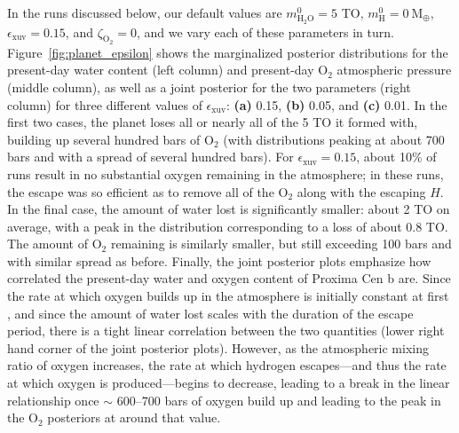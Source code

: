 \documentclass[]{emulateapj}
\begin{document}
In the runs discussed below, our default values are $m_\mathrm{H_2O}^0 = 5$ TO, $m_\mathrm{H}^0 = 0\ \mathrm{M_\oplus}$,
$\epsilon_\mathrm{xuv} = 0.15$, and $\zeta_\mathrm{O_2} = 0$, and we vary each of these parameters in turn. 
Figure~\ref{fig:planet_epsilon} shows the marginalized posterior distributions for the present-day water content (left column)
and present-day O$_2$ atmospheric pressure (middle column), as well as a joint posterior for the two parameters (right column)
for three different values of $\epsilon_\mathrm{xuv}$: \textbf{(a)} 0.15, \textbf{(b)} 0.05, and \textbf{(c)} 0.01. In the first
two cases, the planet loses all or nearly all of the 5 TO it formed with, building up several hundred bars of O$_2$ (with
distributions peaking at about 700 bars and with a spread of several hundred bars). For $\epsilon_\mathrm{xuv} = 0.15$, about
10\% of runs result in no substantial oxygen remaining in the atmosphere; in these runs, the escape was so efficient as to
remove all of the O$_2$ along with the escaping $H$. In the final case, the amount of water lost is significantly smaller:
about 2 TO on average, with a peak in the distribution corresponding to a loss of about 0.8 TO. The amount of O$_2$
remaining is similarly smaller, but still exceeding 100 bars and with similar spread as before. Finally, the joint posterior
plots emphasize how correlated the present-day water and oxygen content of Proxima Cen b are. Since the rate at which
oxygen builds up in the atmosphere is initially constant at first \citep{LugerBarnes15}, and since the amount of water
lost scales with the duration of the escape period, there is a tight linear correlation between the two quantities
(lower right hand corner of the joint posterior plots). However, as the atmospheric mixing ratio of oxygen increases,
the rate at which hydrogen escapes---and thus the rate at which oxygen is produced---begins to decrease, leading to a break
in the linear relationship once $\sim$ 600--700 bars of oxygen build up and leading to the peak in the O$_2$ posteriors
at around that value.
\end{document}

